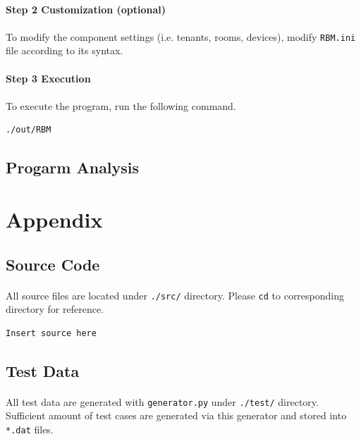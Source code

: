 \documentclass{article}
\begin{document}
            \paragraph{Step 2 Customization (optional)}
            \paragraph{}
                To modify the component settings (i.e. tenants, rooms, devices),
                modify \texttt{RBM.ini} file according to its syntax.
            \paragraph{Step 3 Execution}
            \paragraph{}
                To execute the program, run the following command.
            \begin{Verbatim}[gobble=8]
                ./out/RBM
            \end{Verbatim}

        \subsection{Progarm Analysis}
            
    \cleardoublepage
    \section{Appendix}
        \subsection{Source Code}
            \paragraph{}
                All source files are located under \texttt{./src/} directory. Please \texttt{cd}
                to corresponding directory for reference.
            \begin{Verbatim}[gobble=8]
                Insert source here
            \end{Verbatim}
        \subsection{Test Data}
            \paragraph{}
                All test data are generated with \texttt{generator.py} under \texttt{./test/}
                directory. Sufficient amount of test cases are generated via this generator
                and stored into \texttt{*.dat} files.
\end{document}
